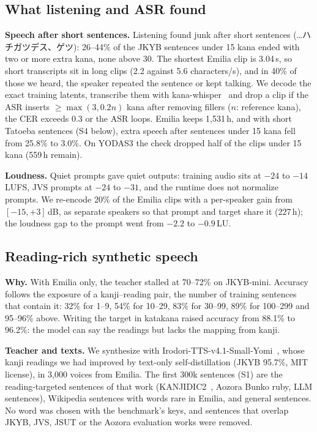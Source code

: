 \documentclass[10pt,a4paper,twocolumn]{article}
\begin{document}
\subsection{What listening and ASR found}\label{sec:found}
\textbf{Speech after short sentences.} Listening found junk after short sentences
(…ハチガツデス、ゲツ): 26--44\% of the JKYB sentences under 15 kana ended with two or more extra kana,
none above 30. The shortest Emilia clip is 3.04\,s, so short transcripts sit in long clips (2.2
against 5.6 characters/s), and in 40\% of those we heard, the speaker repeated the sentence or kept
talking. We decode the exact training latents, transcribe them with kana-whisper~\cite{kanawhisper}
and drop a clip if the ASR inserts $\ge\max(3,0.2n)$ kana after removing fillers ($n$: reference
kana), the CER exceeds 0.3 or the ASR loops. Emilia keeps 1,531\,h, and with short Tatoeba sentences
(S4 below), extra speech after sentences under 15 kana fell from 25.8\% to 3.0\%. On YODAS3 the
check dropped half of the clips under 15 kana (559\,h remain).

\textbf{Loudness.} Quiet prompts gave quiet outputs: training audio sits at $-24$ to $-14$\,LUFS,
JVS prompts at $-24$ to $-31$, and the runtime does not normalize prompts. We re-encode 20\% of the
Emilia clips with a per-speaker gain from $[-15,+3]$\,dB, as separate speakers so that prompt and
target share it (227\,h); the loudness gap to the prompt went from $-2.2$ to $-0.9$\,LU.

\subsection{Reading-rich synthetic speech}
\textbf{Why.} With Emilia only, the teacher stalled at 70--72\% on JKYB-mini. Accuracy follows the
exposure of a kanji--reading pair, the number of training sentences that contain it: 32\% for 1--9,
54\% for 10--29, 83\% for 30--99, 89\% for 100--299 and 95--96\% above. Writing the target in
katakana raised accuracy from 88.1\% to 96.2\%: the model can say the readings but lacks the mapping
from kanji.

\textbf{Teacher and texts.} We synthesize with Irodori-TTS-v4.1-Small-Yomi~\cite{yomi}, whose kanji
readings we had improved by text-only self-distillation (JKYB 95.7\%, MIT license), in 3,000 voices
from Emilia. The first 300k sentences (S1) are the reading-targeted sentences of that work
(KANJIDIC2~\cite{jmdict}, Aozora Bunko ruby, LLM sentences), Wikipedia sentences with words rare in
Emilia, and general sentences. No word was chosen with the benchmark's keys, and sentences that
overlap JKYB, JVS, JSUT or the Aozora evaluation works were removed.
\end{document}
